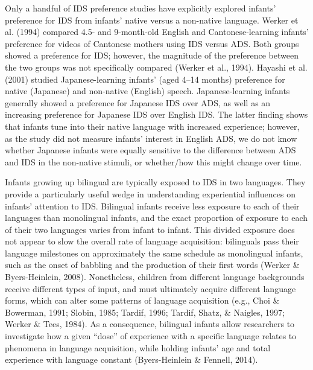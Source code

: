 \documentclass[,man,floatsintext]{apa6}
\begin{document}
Only a handful of IDS preference studies have explicitly explored infants' preference for IDS from infants' native versus a non-native language. Werker et al. (1994) compared 4.5- and 9-month-old English and Cantonese-learning infants' preference for videos of Cantonese mothers using IDS versus ADS. Both groups showed a preference for IDS; however, the magnitude of the preference between the two groups was not specifically compared (Werker et al., 1994). Hayashi et al. (2001) studied Japanese-learning infants' (aged 4--14 months) preference for native (Japanese) and non-native (English) speech. Japanese-learning infants generally showed a preference for Japanese IDS over ADS, as well as an increasing preference for Japanese IDS over English IDS. The latter finding shows that infants tune into their native language with increased experience; however, as the study did not measure infants' interest in English ADS, we do not know whether Japanese infants were equally sensitive to the difference between ADS and IDS in the non-native stimuli, or whether/how this might change over time.

Infants growing up bilingual are typically exposed to IDS in two languages. They provide a particularly useful wedge in understanding experiential influences on infants' attention to IDS. Bilingual infants receive less exposure to each of their languages than monolingual infants, and the exact proportion of exposure to each of their two languages varies from infant to infant. This divided exposure does not appear to slow the overall rate of language acquisition: bilinguals pass their language milestones on approximately the same schedule as monolingual infants, such as the onset of babbling and the production of their first words (Werker \& Byers-Heinlein, 2008). Nonetheless, children from different language backgrounds receive different types of input, and must ultimately acquire different language forms, which can alter some patterns of language acquisition (e.g., Choi \& Bowerman, 1991; Slobin, 1985; Tardif, 1996; Tardif, Shatz, \& Naigles, 1997; Werker \& Tees, 1984). As a consequence, bilingual infants allow researchers to investigate how a given \enquote{dose} of experience with a specific language relates to phenomena in language acquisition, while holding infants' age and total experience with language constant (Byers-Heinlein \& Fennell, 2014).
\end{document}
